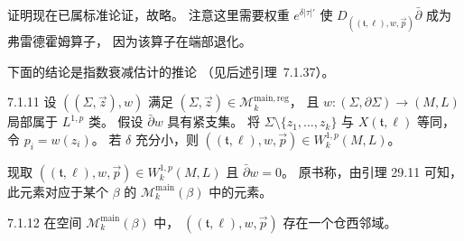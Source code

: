 证明现在已属标准论证，故略。
注意这里需要权重 $e^{\delta|\tau|'}$
使 $D_{((\mathfrak t,\ell),w,\vec p)}\bar\partial$
成为弗雷德霍姆算子，
因为该算子在端部退化。

下面的结论是指数衰减估计的推论
（见后述引理~7.1.37）。

\begin{lemma}{7.1.11}\label{lem:7-1-11}
设 $((\Sigma,\vec z),w)$ 满足
$(\Sigma,\vec z)\in\mathcal M_k^{\mathrm{main,reg}}$，
且 $w\colon(\Sigma,\partial\Sigma)\to(M,L)$
局部属于 $L^{1,p}$ 类。
假设 $\bar\partial w$ 具有紧支集。
将 $\Sigma\setminus\{z_1,\ldots,z_k\}$
与 $X(\mathfrak t,\ell)$ 等同，令 $p_i=w(z_i)$。
若 $\delta$ 充分小，则
$((\mathfrak t,\ell),w,\vec p)\in W_k^{1,p}(M,L)$。
\end{lemma}

现取
$((\mathfrak t,\ell),w,\vec p)\in W_k^{1,p}(M,L)$
且 $\bar\partial w=0$。
原书称，由引理 29.11 可知，
此元素对应于某个 $\beta$ 的
$\mathcal M_k^{\mathrm{main}}(\beta)$
中的元素。

\begin{proposition}{7.1.12}\label{prop:7-1-12}
在空间 $\mathcal M_k^{\mathrm{main}}(\beta)$ 中，
$((\mathfrak t,\ell),w,\vec p)$
存在一个仓西邻域。
\end{proposition}

